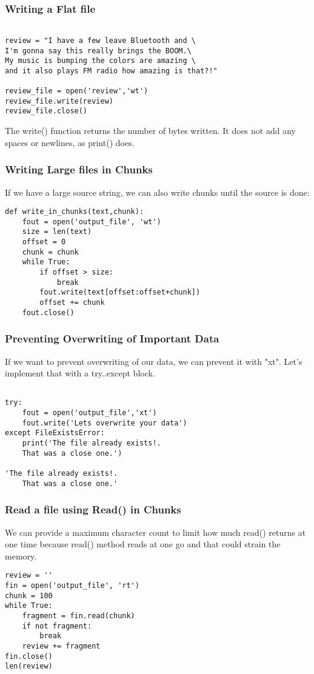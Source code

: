 \documentclass{beamer}
\begin{document}
\begin{frame}[fragile]
\frametitle{Writing a Flat file}
\begin{lstlisting}

review = "I have a few leave Bluetooth and \
I'm gonna say this really brings the BOOM.\
My music is bumping the colors are amazing \
and it also plays FM radio how amazing is that?!"

review_file = open('review','wt')
review_file.write(review)
review_file.close()
\end{lstlisting}

The write() function returns the number of bytes written. It does not add any spaces
or newlines, as print() does.
\end{frame}


\begin{frame}[fragile]
\frametitle{Writing Large files in Chunks}
If we have a large source string, we can also write chunks until the source is done:

\begin{lstlisting}
def write_in_chunks(text,chunk):
    fout = open('output_file', 'wt')
    size = len(text)
    offset = 0
    chunk = chunk
    while True:
        if offset > size:
            break
        fout.write(text[offset:offset+chunk])
        offset += chunk
    fout.close()
\end{lstlisting}
\end{frame}


\begin{frame}[fragile]
\frametitle{Preventing Overwriting of Important Data}
If we want to prevent overwriting of our data, we can prevent it with "xt". Let's implement that with a try..except block.
\begin{lstlisting}

try:
	fout = open('output_file','xt')
	fout.write('Lets overwrite your data')
except FileExistsError:
	print('The file already exists!. 
	That was a close one.')
	
'The file already exists!. 
	That was a close one.'
\end{lstlisting}
\end{frame}


\begin{frame}[fragile]
\frametitle{Read a file using Read() in Chunks}
We can provide a maximum character count to limit how much read() returns at one
time because read() method reads at one go and that could strain the memory.

\begin{lstlisting}
review = ''
fin = open('output_file', 'rt')
chunk = 100
while True:
    fragment = fin.read(chunk)
    if not fragment:
        break
    review += fragment
fin.close()
len(review)
\end{lstlisting}
\end{frame}
\end{document}
